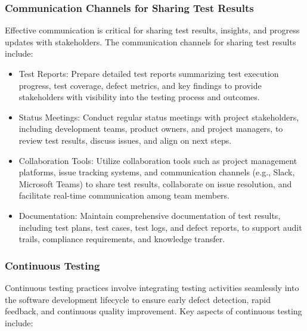 		\subsubsection{Communication Channels for Sharing Test Results}
		
		Effective communication is critical for sharing test results, insights, and progress updates with stakeholders. The communication channels for sharing test results include:
		
		\begin{itemize}
			\item Test Reports: Prepare detailed test reports summarizing test execution progress, test coverage, defect metrics, and key findings to provide stakeholders with visibility into the testing process and outcomes.
			\item Status Meetings: Conduct regular status meetings with project stakeholders, including development teams, product owners, and project managers, to review test results, discuss issues, and align on next steps.
			\item Collaboration Tools: Utilize collaboration tools such as project management platforms, issue tracking systems, and communication channels (e.g., Slack, Microsoft Teams) to share test results, collaborate on issue resolution, and facilitate real-time communication among team members.
			\item Documentation: Maintain comprehensive documentation of test results, including test plans, test cases, test logs, and defect reports, to support audit trails, compliance requirements, and knowledge transfer.
		\end{itemize}
		
		\subsubsection{Continuous Testing}
		
		Continuous testing practices involve integrating testing activities seamlessly into the software development lifecycle to ensure early defect detection, rapid feedback, and continuous quality improvement. Key aspects of continuous testing include:
		

